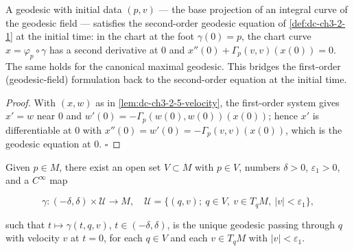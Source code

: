 \begin{lemma}
  \label{lem:dc-ch3-2-5-equation}
  \leanok
  A geodesic with initial data $(p,v)$ — the base projection of an integral
  curve of the geodesic field — satisfies the second-order geodesic equation of
  \cref{def:dc-ch3-2-1} at the initial time: in the chart at the foot
  $\gamma(0)=p$, the chart curve $x=\varphi_p\circ\gamma$ has a second
  derivative at $0$ and $x''(0)+\Gamma_p(v,v)(x(0))=0$. The same holds for the
  canonical maximal geodesic. This bridges the first-order (geodesic-field)
  formulation back to the second-order equation at the initial time.
\end{lemma}
\begin{proof}
  \leanok
  With $(x,w)$ as in \cref{lem:dc-ch3-2-5-velocity}, the first-order system
  gives $x'=w$ near $0$ and $w'(0)=-\Gamma_p(w(0),w(0))(x(0))$; hence $x'$ is
  differentiable at $0$ with
  $x''(0)=w'(0)=-\Gamma_p(v,v)(x(0))$, which is the geodesic equation at $0$.
  $\square$
\end{proof}

\begin{proposition}
  \label{prop:dc-ch3-2-5}
  Given $p\in M$, there exist an open set $V\subset M$ with $p\in V$, numbers
  $\delta>0$, $\varepsilon_1>0$, and a $C^\infty$ map
  
  $$
  \gamma:(-\delta,\delta)\times\mathcal{U}\to M,\quad\mathcal{U}=\{(q,v);\ q\in V,\ v\in T_qM,\ |v|<\varepsilon_1\},
  $$
  
  such that $t\mapsto\gamma(t,q,v)$, $t\in(-\delta,\delta)$, is the unique geodesic
  passing through $q$ with velocity $v$ at $t=0$, for each $q\in V$ and each
  $v\in T_qM$ with $|v|<\varepsilon_1$.
\end{proposition}

